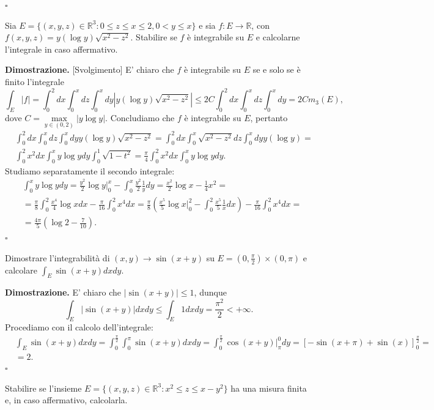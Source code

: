\hfill $\square$
%
\vspace{0.5cm}
\begin{exercise}
	Sia $E = \{ (x, y, z) \in \mathbb{R}^3 : 0 \leq z \leq x \leq 2, 0 < y \leq x \}$ e sia $f: E \to \mathbb{R}$, con $f(x, y, z) = y(\log{y})\sqrt{x^2 - z^2}$. Stabilire se $f$ è integrabile su $E$ e calcolarne l'integrale in caso affermativo.
\end{exercise}
%
\noindent \textbf{Dimostrazione. } [Svolgimento]
	E' chiaro che $f$ è integrabile su $E$ se e solo se è finito l'integrale
	$$
		\int_E |f| = \int_0^2 dx \int_0^x dz \int_0^x dy |y(\log{y})\sqrt{x^2 - z^2}| \leq 2C \int_0^2 dx \int_0^x dz \int_0^x dy = 2C m_3(E),
	$$
	dove $C = \max\limits_{y \in (0, 2)} |y\log{y}|$. Concludiamo che $f$ è integrabile su $E$, pertanto
	\[\begin{aligned}
	&\int_0^2 dx \int_0^x dz \int_0^x dy y(\log{y}) \sqrt{x^2 - z^2} = \int_0^2 dx \int_0^x \sqrt{x^2 - z^2} dz \int_0^x dy y(\log{y}) = \\
	&\int_0^2 x^2 dx \int_0^x y\log{y} dy \int_0^1  \sqrt{1 - t^2} = \frac{\pi}{4} \int_0^2 x^2 dx \int_0^x y\log{y}dy. 
	\end{aligned}\]
	Studiamo separatamente il secondo integrale:
	\[\begin{aligned}
		&\int_0^x y\log{y}dy = \frac{y^2}{2} \log{y}|^x_0 - \int_0^x \frac{y^2}{2} \frac{1}{y}dy = \frac{x^2}{2} \log{x} - \frac{1}{4}x^2 = \\
		&=\frac{\pi}{8} \int_0^2 \frac{x^4}{4} \log{x} dx - \frac{\pi}{16} \int_0^2 x^4 dx = \frac{\pi}{8} \left(\frac{x^5}{5} \log{x}|^2_0 - \int_0^2 \frac{x^5}{5} \frac{1}{x} dx \right) - \frac{\pi}{16} \int_0^2 x^4 dx = \\
		&=\frac{4\pi}{5}(\log{2} - \frac{7}{10}).  
	\end{aligned}\]
\hfill $\square$
%
\vspace{0.5cm}
\begin{exercise}
	Dimostrare l'integrabilità di $(x, y) \to \sin{(x+y)}$ su $E = (0, \frac{\pi}{2}) \times (0, \pi)$ e calcolare $\int_E \sin{(x+y)}dxdy$.
\end{exercise}

\noindent \textbf{Dimostrazione. }
	E' chiaro che $|\sin{(x+y)}| \leq 1$, dunque
	$$
		\int_E |\sin{(x+y)}| dxdy \leq \int_E 1 dxdy = \frac{\pi^2}{2} < +\infty.
	$$
	Procediamo con il calcolo dell'integrale:
	\[\begin{aligned}
		&\int_E \sin{(x+y)}dxdy = \int_0^{\frac{\pi}{2}} \int_0^\pi \sin{(x+y)}dxdy = \int_0^{\frac{\pi}{2}} \cos{(x+y)}|^0_\pi dy = \left[ -\sin{(x+\pi)} + \sin{(x)} \right]^\frac{\pi}{2}_0 = \\
		&= 2.
	\end{aligned}\]
\hfill $\square$
%
\vspace{0.5cm}
\begin{exercise}
	Stabilire se l'insieme $E=\{(x, y, z) \in \mathbb{R}^3: x^2 \leq z \leq x - y^2 \}$ ha una misura finita e, in caso affermativo, calcolarla.
\end{exercise}

